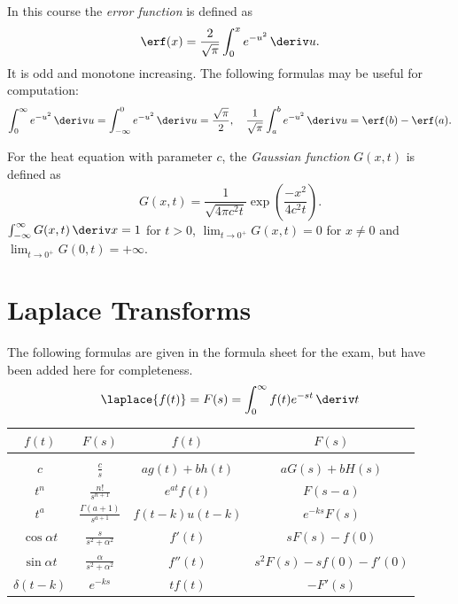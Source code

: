 \documentclass[10pt, a4paper]{article}
\begin{document}
\begin{landscape}
\begin{multicols}{2}
    In this course the \emph{error function} is defined as
    \[
        \erf(x) = \frac{2}{\sqrt{\pi}} \int_0^x e^{-u^2} \,\deriv u.
    \]
    It is odd and monotone increasing. The following formulas may be useful for computation:
    \[
        \int_0^{\infty} e^{-u^2} \,\deriv u = \int_{-\infty}^{0} e^{-u^2} \,\deriv u
        = \frac{\sqrt{\pi}}{2},
        \quad
        \frac{1}{\sqrt{\pi}} \int_a^b e^{-u^2} \,\deriv u
        = \erf(b) - \erf(a).
    \]

    For the heat equation with parameter \(c\), the \emph{Gaussian function} \(G(x, t)\) is defined as
    \[
        G(x, t) = \frac{1}{\sqrt{4 \pi c^2 t}} \exp \left(
            \frac{-x^2}{4c^2 t}
        \right).
    \]
    \(\int_{-\infty}^{\infty} G(x, t) \,\deriv x = 1\) for \(t > 0\),
    \(\lim_{t \to 0^+} G(x, t) = 0\) for \(x \neq 0\) and
    \(\lim_{t \to 0^+} G(0, t) = +\infty\).

    \section{Laplace Transforms}

    The following formulas are given in the formula sheet for the exam, but have been
    added here for completeness.
    \[
        \laplace\{f(t)\} = F(s) = \int_0^{\infty} f(t) e^{-st} \,\deriv t
    \]

    {
    \everymath{\displaystyle}
    \begin{center}
    \begin{tabular}{cc@{\hskip 1cm}cc}
        \toprule
        \(f(t)\) & \(F(s)\) & \(f(t)\) & \(F(s)\) \\
        \midrule \\[-10pt]
        \(c\) & \(\frac{c}{s}\) & \(a g(t) + b h(t)\) & \(a G(s) + b H(s)\) \\[10pt]
        \(t^{n}\) & \(\frac{n!}{s^{n+1}}\) & \(e^{at} f(t)\) & \(F(s-a)\) \\[10pt]
        \(t^{a}\) & \(\frac{\Gamma(a+1)}{s^{a+1}}\) & \(f(t-k)u(t-k)\) & \(e^{-ks} F(s)\) \\[10pt]
        \(\cos \alpha t\) & \(\frac{s}{s^{2} + \alpha^{2}}\) & \(f'(t)\) & \(s F(s) - f(0)\) \\[10pt]
        \(\sin \alpha t\) & \(\frac{\alpha}{s^{2} + \alpha^{2}}\) & \(f''(t)\) & \(s^{2} F(s) - sf(0) - f'(0)\) \\[10pt]
        \(\delta(t - k)\) & \(e^{-ks}\) & \(t f(t)\) & \(-F'(s)\) \\[1pt]
        \bottomrule
    \end{tabular}
    \end{center}
    }


\end{multicols}
\end{landscape}
\end{document}

